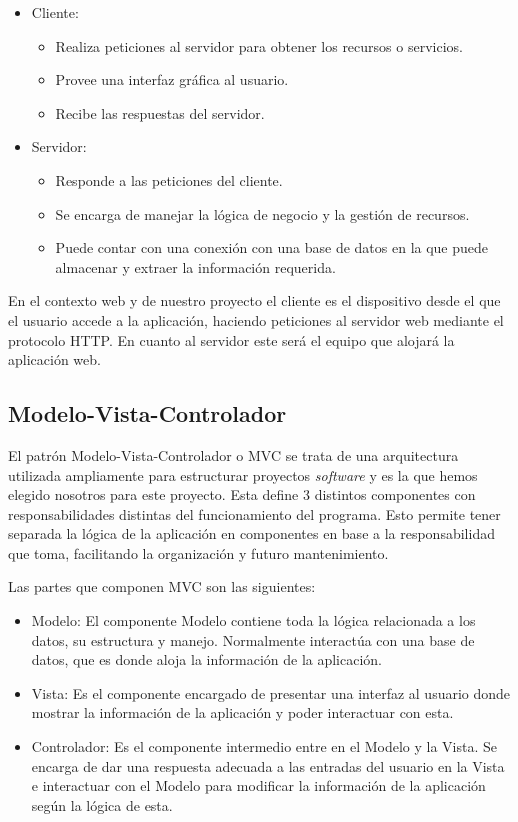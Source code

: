 \begin{itemize}
	\item Cliente:
	\begin{itemize}
		\item Realiza peticiones al servidor para obtener los recursos o servicios.
		\item Provee una interfaz gráfica al usuario.
		\item Recibe las respuestas del servidor.
	\end{itemize}
	\item Servidor:
	\begin{itemize}
		\item Responde a las peticiones del cliente.
		\item Se encarga de manejar la lógica de negocio y la gestión de recursos.
		\item Puede contar con una conexión con una base de datos en la que puede almacenar y extraer la información requerida.
	\end{itemize}
\end{itemize}


En el contexto web y de nuestro proyecto el cliente es el dispositivo desde el que el usuario accede a la aplicación, haciendo peticiones al servidor web mediante el protocolo HTTP. En cuanto al servidor este será el equipo que alojará la aplicación web.
\subsection{Modelo-Vista-Controlador}

El patrón Modelo-Vista-Controlador o MVC se trata de una arquitectura utilizada ampliamente para estructurar proyectos \textit{software} y es la que hemos elegido nosotros para este proyecto. Esta define 3 distintos componentes con responsabilidades distintas del funcionamiento del programa. Esto permite tener separada la lógica de la aplicación en componentes en base a la responsabilidad que toma, facilitando la organización y futuro mantenimiento.


Las partes que componen MVC son las siguientes:
\begin{itemize}
	\item Modelo: El componente Modelo contiene toda la lógica relacionada a los datos, su estructura y manejo. Normalmente interactúa con una base de datos, que es donde aloja la información de la aplicación.
	\item Vista: Es el componente encargado de presentar una interfaz al usuario donde mostrar la información de la aplicación y poder interactuar con esta.
	\item Controlador: Es el componente intermedio entre en el Modelo y la Vista. Se encarga de dar una respuesta adecuada a las entradas del usuario en la Vista e interactuar con el Modelo para modificar la información de la aplicación según la lógica de esta. 
\end{itemize}

